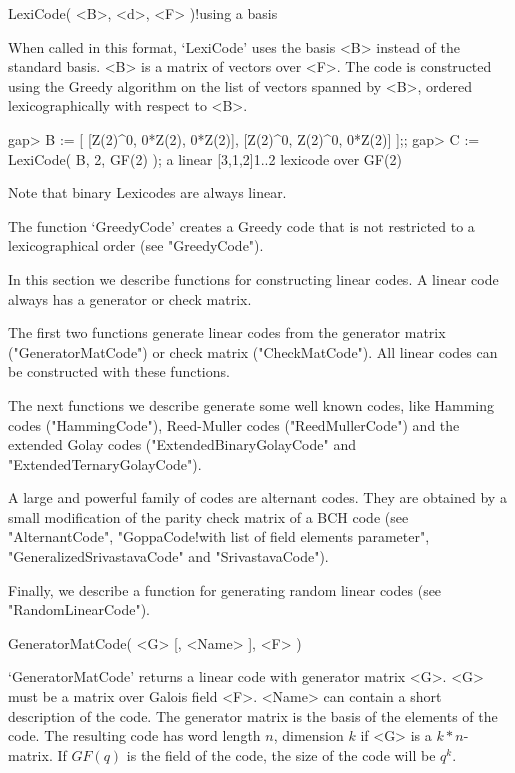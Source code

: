 \>LexiCode( <B>, <d>, <F> )!{using a basis}

When called in this format, `LexiCode' uses the  basis <B> instead of the
standard basis. <B>  is  a  matrix of vectors    over <F>.  The  code  is
constructed using the Greedy algorithm on the  list of vectors spanned by
<B>, ordered lexicographically with respect to <B>.

\beginexample
gap> B := [ [Z(2)^0, 0*Z(2), 0*Z(2)], [Z(2)^0, Z(2)^0, 0*Z(2)] ];;
gap> C := LexiCode( B, 2, GF(2) );
a linear [3,1,2]1..2 lexicode over GF(2) 
\endexample

Note that binary Lexicodes are always linear.

The function `GreedyCode' creates a Greedy code that is not restricted to
a lexicographical order (see "GreedyCode").


In this section we describe functions for constructing  linear  codes.  A
linear code always has a generator or check matrix.

The first two functions generate linear codes from the  generator  matrix
("GeneratorMatCode") or check matrix ("CheckMatCode"). All  linear  codes
can be constructed with these functions.

The next functions we describe  generate  some  well  known  codes,  like
Hamming codes ("HammingCode"), Reed-Muller codes  ("ReedMullerCode")  and
the    extended    Golay     codes     ("ExtendedBinaryGolayCode"     and
"ExtendedTernaryGolayCode").

A large and powerful family  of  codes  are  alternant  codes.  They  are
obtained by a small modification of the parity check matrix of a BCH code
(see "AlternantCode", "GoppaCode!with list of field elements  parameter",
"GeneralizedSrivastavaCode" and "SrivastavaCode").

Finally, we describe a function for generating random linear  codes  (see
"RandomLinearCode").

\>GeneratorMatCode( <G> [, <Name> ], <F> )

`GeneratorMatCode'  returns a linear  code with generator matrix <G>. <G>
must be  a matrix  over Galois  field   <F>. <Name> can  contain  a short
description of  the  code.  The  generator matrix  is  the basis  of  the
elements of the  code. The resulting code  has word length $n$, dimension
$k$ if <G> is a $k * n$-matrix. If $GF(q)$ is the field of the code, the
size of the code will be $q^k$.

